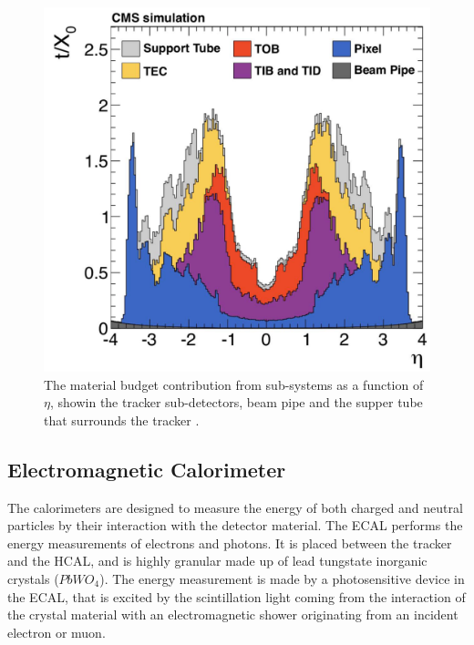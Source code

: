 \begin{figure}[ht]
	\centering
	\includegraphics[scale=0.6]{MSc_Thesis/fig/Mbudget.png}
	\vspace{2mm}
	\caption[The material budget contribution from sub-systems as a function of $\eta$, showin the tracker sub-detectors, beam pipe and the supper tube that surrounds the tracker.]{The material budget contribution from sub-systems as a function of $\eta$, showin the tracker sub-detectors, beam pipe and the supper tube that surrounds the tracker \cite{Mbudget}.}
	\label{Mbudget}
\end{figure}

\subsection{Electromagnetic Calorimeter}

The calorimeters are designed to measure the energy of both charged and neutral particles by their interaction with the detector material. The ECAL \cite{CERN-LHCC-97-033} performs the energy measurements of electrons and photons. It is placed between the tracker and the HCAL, and is highly granular made up of lead tungstate inorganic crystals ($PbWO_4$). The energy measurement is made by a photosensitive device in the ECAL, that is excited by the scintillation light coming from the interaction of the crystal material with an electromagnetic shower originating from an incident electron or muon.

